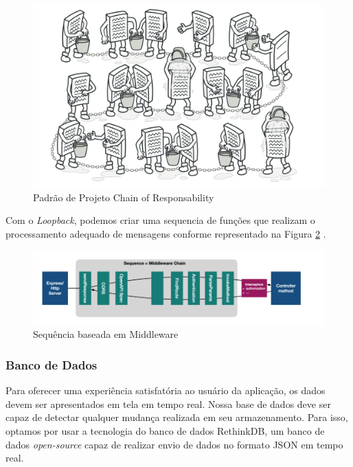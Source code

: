 \begin{figure}[H]
	\centering
	\label{chain-of-responsibility}
		\includegraphics[keepaspectratio=true,scale=0.22]{figuras/chain-of-responsibility.png}
	\caption{Padrão de Projeto Chain of Responsability \cite{ChainFigura}}
	\label{fig:chain-of-responsibility}
\end{figure}

\par Com o \textit{Loopback}, podemos criar uma sequencia de funções que realizam o processamento adequado de mensagens conforme representado na Figura \ref{fig:middleware} \cite{Loopback}.

\begin{figure}[H]
	\centering
	\label{middleware}
		\includegraphics[keepaspectratio=true,scale=0.75]{figuras/middleware.png}
	\caption{Sequência baseada em Middleware  \cite{Loopback}}
	\label{fig:middleware}
\end{figure}


\subsubsection{Banco de Dados}

\par Para oferecer uma experiência satisfatória ao usuário da aplicação, os dados devem ser apresentados em tela em tempo real. Nossa base de dados deve ser capaz de detectar qualquer mudança realizada em seu armazenamento. Para isso, optamos por usar a tecnologia do banco de dados RethinkDB, um banco de dados \textit{open-source} capaz de realizar envio de dados no formato JSON em tempo real. 

